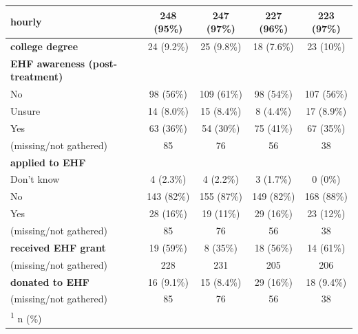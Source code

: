 \documentclass[
  11pt,
  oneside]{article}
\begin{document}
\begin{table}
\begin{tabular}[t]{l|c|c|c|c}
\hline
\textbf{hourly} & 248 (95\%) & 247 (97\%) & 227 (96\%) & 223 (97\%)\\
\hline
\textbf{college degree} & 24 (9.2\%) & 25 (9.8\%) & 18 (7.6\%) & 23 (10\%)\\
\hline
\textbf{EHF awareness (post-treatment)} &  &  &  & \\
\hline
\hspace{1em}No & 98 (56\%) & 109 (61\%) & 98 (54\%) & 107 (56\%)\\
\hline
\hspace{1em}Unsure & 14 (8.0\%) & 15 (8.4\%) & 8 (4.4\%) & 17 (8.9\%)\\
\hline
\hspace{1em}Yes & 63 (36\%) & 54 (30\%) & 75 (41\%) & 67 (35\%)\\
\hline
\hspace{1em}(missing/not gathered) & 85 & 76 & 56 & \vphantom{2} 38\\
\hline
\textbf{applied to EHF} &  &  &  & \\
\hline
\hspace{1em}Don't know & 4 (2.3\%) & 4 (2.2\%) & 3 (1.7\%) & 0 (0\%)\\
\hline
\hspace{1em}No & 143 (82\%) & 155 (87\%) & 149 (82\%) & 168 (88\%)\\
\hline
\hspace{1em}Yes & 28 (16\%) & 19 (11\%) & 29 (16\%) & 23 (12\%)\\
\hline
\hspace{1em}(missing/not gathered) & 85 & 76 & 56 & \vphantom{1} 38\\
\hline
\textbf{received EHF grant} & 19 (59\%) & 8 (35\%) & 18 (56\%) & 14 (61\%)\\
\hline
\hspace{1em}(missing/not gathered) & 228 & 231 & 205 & 206\\
\hline
\textbf{donated to EHF} & 16 (9.1\%) & 15 (8.4\%) & 29 (16\%) & 18 (9.4\%)\\
\hline
\hspace{1em}(missing/not gathered) & 85 & 76 & 56 & 38\\
\hline
\multicolumn{5}{l}{\rule{0pt}{1em}\textsuperscript{1} n (\%)}\\
\end{tabular}
\end{table}
\end{document}
